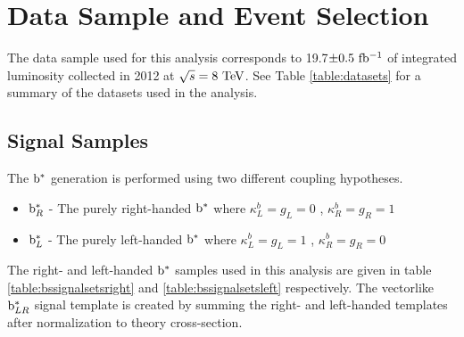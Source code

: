 \section{Data Sample and Event Selection}
\label{sec:bsdatasampleAndSelection}
The data sample used for this analysis corresponds to 19.7$\pm0.5~\mathrm{fb^{-1}}$ of integrated 
luminosity collected in 2012 at $\sqrt{s} = 8~\mathrm{TeV}$.  See Table \ref{table:datasets} for a summary of the datasets used in the analysis.

\subsection{Signal Samples}
\label{sec:bssignal}


The $\mathrm{b}^{*}$ generation is performed using two different coupling hypotheses. 
\begin{itemize}
\item {\bf $\mathrm{b}^{*}_{R}$} - The purely right-handed $\mathrm{b}^{*}$ where $\kappa_{L}^{b}=g_{L}=0$ , $\kappa_{R}^{b}=g_{R}=1$ 
\item {\bf $\mathrm{b}^{*}_{L}$} - The purely left-handed $\mathrm{b}^{*}$ where $\kappa_{L}^{b}=g_{L}=1$ , $\kappa_{R}^{b}=g_{R}=0$ 
\end{itemize}

The right- and left-handed $\mathrm{b}^{*}$ samples used in this analysis are given in table
\ref{table:bssignalsetsright} and \ref{table:bssignalsetsleft} respectively. The vectorlike $\mathrm{b}^{*}_{LR}$ signal 
template is created by summing the right- and left-handed templates after normalization to theory cross-section.

